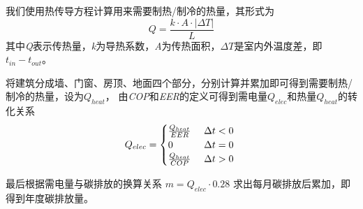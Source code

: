 \documentclass[a4paper, 12pt]{article}
\numberwithin{equation}{section}
\begin{document}
            我们使用热传导方程计算用来需要制热/制冷的热量，其形式为
            \begin{equation}
                Q = \frac{k \cdot A \cdot |\Delta T|}{L}
            \end{equation}
            其中\textit{Q}表示传热量，\textit{k}为导热系数，\textit{A}为传热面积，$ \Delta T $是室内外温度差，即$ t_{in} - t_{out} $。

            将建筑分成墙、门窗、房顶、地面四个部分，分别计算并累加即可得到需要制热/制冷的热量，设为$ Q_{heat} $，
            由\textit{COP}和\textit{EER}的定义可得到需电量$ Q_{elec} $和热量$ Q_{heat} $的转化关系
            \begin{equation}
                Q_{elec} =
                \begin{cases}
                    \frac{Q_{heat}}{EER} & \text{ $ \Delta t < 0 $ } \\
                    0 & \text{ $ \Delta t = 0 $ } \\
                    \frac{Q_{heat}}{COP} & \text{ $ \Delta t > 0 $ }
                \end{cases}
            \end{equation}

            最后根据需电量与碳排放的换算关系 $ m = Q_{elec} \cdot 0.28 $ 求出每月碳排放后累加，即得到年度碳排放量。
\end{document}
